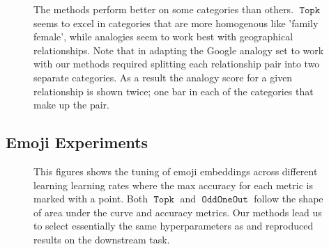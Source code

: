 \documentclass[11pt,a4paper]{article}
\DeclareMathOperator{\OddOneOut}{\texttt{OddOneOut}}
\DeclareMathOperator{\topk}{\texttt{Topk}}
\begin{document}
\begin{figure}
\centering
\caption{
    The methods perform better on some categories than others. $\topk$  seems to excel in categories that are more homogenous like 'family female',
 while analogies seem to work best with geographical relationships.
  Note that in adapting the Google analogy set to work with our methods required splitting each relationship pair into two separate categories. 
  As a result the analogy score for a given relationship is shown twice;
   one bar in each of the categories that make up the pair.
   }
\label{fig:data_vs_methods}
\end{figure}


\subsection{Emoji Experiments}
\begin{figure}
\centering
\caption{This figures shows the tuning of emoji embeddings across different learning learning rates where the max accuracy for each metric is marked with a point.
 Both $\topk$ and $\OddOneOut$ follow the shape of \cite{eisner2016emoji2vec} area under the curve and accuracy metrics.
 Our methods lead us to select essentially the same hyperparameters as \cite{eisner2016emoji2vec} and reproduced results on the downstream task.}
\label{fig:emoji}
\end{figure}
\end{document}
